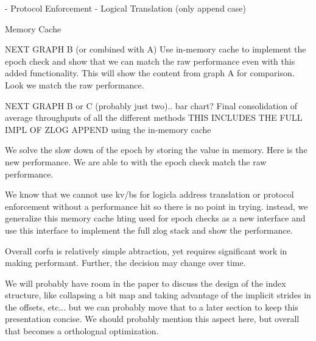 \documentclass[10pt,twocolumn]{article}
\begin{document}
- Protocol Enforcement
- Logical Translation (only append case)

Memory Cache

NEXT GRAPH B (or combined with A)
Use in-memory cache to implement the epoch check and show that we can match
the raw performance even with this added functionality.
This will show the content from graph A for comparison. Look
we match the raw performance.

NEXT GRAPH B or C (probably just two).. bar chart?
 Final consolidation of average throughputs of all the different
methods
 THIS INCLUDES THE FULL IMPL OF ZLOG APPEND using the in-memory cache

We solve the slow down of the epoch by storing the value in memory. Here is
the new performance.  We are able to with the epoch check match the raw
performance.

We know that we cannot use kv/bs for logicla address translation or protocol
enforcement without a performance hit so there is no point in trying. instead,
we generalize this memory cache hting used for epoch checks as a
new interface and use this interface to implement the full zlog
stack and show the performance.

Overall corfu is relatively simple abtraction, yet requires significant
work in making performant. Further, the decision may change over time.

We will probably have room in the paper to discuss the design of the
index structure, like collapsing a bit map and taking advantage of
the implicit strides in the offsets, etc... but we can probably move
that to a later section to keep this presentation concise. We should
probably mention this aspect here, but overall that becomes a ortholognal
optimization.





\end{document}
